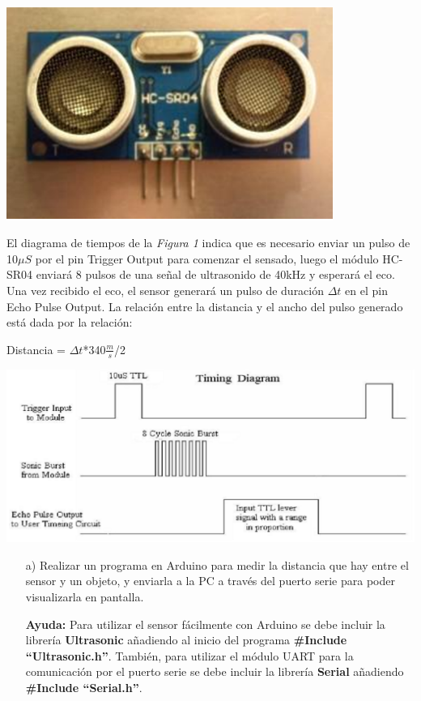 \documentclass[a4paper,11pt]{article}
\begin{document}
\begin{center}
	\includegraphics[width=0.8\textwidth]{fig/sensor.eps} 
\end{center}

El diagrama de tiempos de la \textit{Figura 1} indica que es necesario enviar un pulso de 10$\mu S$ por el pin Trigger Output para comenzar el sensado, luego el módulo HC-SR04 enviará 8 pulsos de una señal de ultrasonido de 40kHz y esperará el eco. Una vez recibido el eco, el sensor generará un pulso de duración $\Delta t$ en el pin Echo Pulse Output. La relación entre la distancia y el ancho del pulso generado está dada por la relación: 
	


	\begin{center}
		Distancia = $\Delta t$*340$\frac{m}{s}$/2
	\end{center}


\begin{center}
	\includegraphics[width=1 \textwidth]{fig/tiempos.eps} 
\end{center}

	
\begin{itemize}
	\item[a) ] Realizar un programa en Arduino para medir la distancia que hay entre el sensor y un objeto, y enviarla a la PC a través del puerto serie para poder visualizarla en pantalla.

\textbf{Ayuda:} Para utilizar el sensor fácilmente con Arduino se debe incluir la librería \textbf{Ultrasonic} añadiendo al inicio del programa \textbf{\#Include "`Ultrasonic.h"'}. También, para utilizar el módulo UART para la comunicación por el puerto serie se debe incluir la librería \textbf{Serial} añadiendo \textbf{\#Include "`Serial.h"'}.
\end{itemize}
\end{document}
